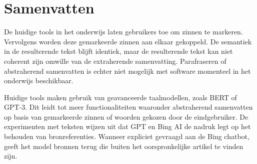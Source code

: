 \section{Samenvatten}

De huidige tools in het onderwijs laten gebruikers toe om zinnen te markeren. Vervolgens worden deze gemarkeerde zinnen aan elkaar gekoppeld. De semantiek in de resulterende tekst blijft identiek, maar de resulterende tekst kan niet coherent zijn omwille van de extraherende samenvatting. Parafraseren of abstraherend samenvatten is echter niet mogelijk met software momenteel in het onderwijs beschikbaar. 

\begin{table}[H]
	\centering
\end{table}

Huidige tools maken gebruik van geavanceerde taalmodellen, zoals BERT of GPT-3. Dit leidt tot meer functionaliteiten waaronder abstraherend samenvatten op basis van gemarkeerde zinnen of woorden gekozen door de eindgebruiker. De experimenten met teksten wijzen uit dat GPT en Bing AI de nadruk legt op het behouden van bronreferenties. Wanneer expliciet gevraagd aan de Bing chatbot, geeft het model bronnen terug die buiten het oorspronkelijke artikel te vinden zijn. 

